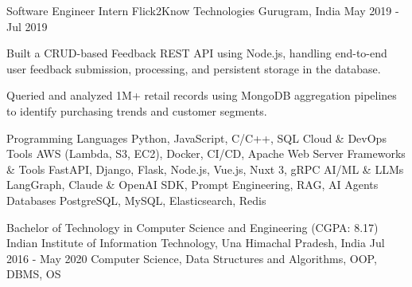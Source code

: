 \documentclass[11pt, a4paper]{awesome-cv}
\begin{document}
\begin{cventries}
\vspace{0.6cm}  %

\cventry
    {Software Engineer Intern} %
    {Flick2Know Technologies} %
    {Gurugram, India} %
    {May 2019 - Jul 2019} %
    {
      \begin{cvitems}
        \item {Built a CRUD-based Feedback REST API using Node.js, handling end-to-end user feedback submission, processing, and persistent storage in the database.}
        \item {Queried and analyzed 1M+ retail records using MongoDB aggregation pipelines to identify purchasing trends and customer segments.}
      \end{cvitems}
    }

\end{cventries}


\vspace{0.4cm}  %

\begin{cvskills}
\cvskill
    {Programming Languages}
    {Python, JavaScript, C/C++, SQL}
\cvskill
    {Cloud \& DevOps Tools}
    {AWS (Lambda, S3, EC2), Docker, CI/CD, Apache Web Server}
\cvskill
    {Frameworks \& Tools}
    {FastAPI, Django, Flask, Node.js, Vue.js, Nuxt 3, gRPC}
\cvskill
    {AI/ML \& LLMs}
    {LangGraph, Claude \& OpenAI SDK, Prompt Engineering, RAG, AI Agents}
\cvskill
    {Databases}
    {PostgreSQL, MySQL, Elasticsearch, Redis}
\end{cvskills}


\begin{cventries}

\cventry
    {Bachelor of Technology in Computer Science and Engineering (CGPA: 8.17)} %
    {Indian Institute of Information Technology, Una} %
    {Himachal Pradesh, India} %
    {Jul 2016 - May 2020} %
    {Computer Science, Data Structures and Algorithms, OOP, DBMS, OS}


\end{cventries}

\end{document}
